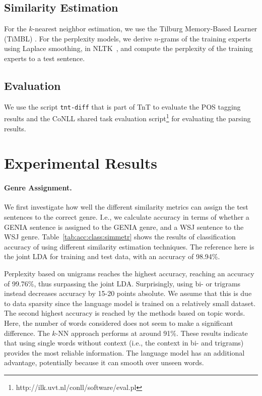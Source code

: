 \subsection{Similarity Estimation}

For the $k$-nearest neighbor estimation, we use the Tilburg Memory-Based Learner (TiMBL) \cite{daelemans:zavrel:ea:10}. For the perplexity models, we derive $n$-grams  of the training experts using  Laplace smoothing, in NLTK~\cite{bird2009natural}, and compute the perplexity of the training experts to a test sentence.

\subsection{Evaluation}

We use the script \texttt{tnt-diff} that is part of TnT to evaluate the POS tagging results  and the CoNLL shared task evaluation script\footnote{http://ilk.uvt.nl/conll/software/eval.pl} for evaluating the parsing results.


\section{Experimental Results} \label{exptres}

\paragraph{Genre Assignment.}
We first investigate how well the different similarity metrics can assign the test sentences to the correct genre. I.e., we calculate accuracy in terms of whether a GENIA sentence is assigned to the GENIA genre, and a WSJ sentence to the WSJ genre.
Table~\ref{tab:acc:class:simmetr} shows the results of classification accuracy of using different similarity estimation techniques. The reference here is the joint LDA for training and test data, with an accuracy of 98.94\%. 
 
Perplexity based on unigrams reaches the highest accuracy, reaching an accuracy of 99.76\%, thus surpassing the joint LDA. Surprisingly, using bi- or trigrams instead decreases accuracy by 15-20 points absolute. We assume that this is due to data sparsity since the language model is trained on a relatively small dataset. The second highest accuracy is reached by the methods based on topic words. Here, the number of words considered does not seem to make a significant difference. The $k$-NN approach performs at around 91\%. These results indicate that using single words without context (i.e., the context in bi- and trigrams) provides the most reliable information. The language model has an additional advantage, potentially because it can smooth over unseen words.
  
